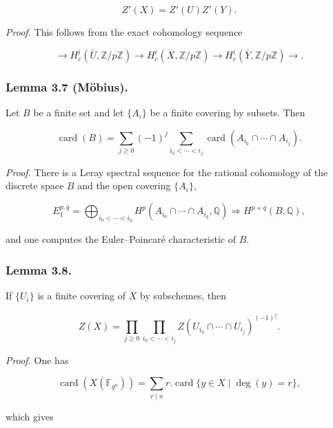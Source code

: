 \begin{equation}\tag{3.6.1}
Z'(X)=Z'(U)Z'(Y).
\end{equation}

\medskip
\noindent\emph{Proof.}
This follows from the exact cohomology sequence

\begin{equation}\tag{3.6.2}
\longrightarrow H_c^i(\bar U,\mathbb Z/p\mathbb Z)
\longrightarrow H_c^i(\bar X,\mathbb Z/p\mathbb Z)
\longrightarrow H_c^i(\bar Y,\mathbb Z/p\mathbb Z)\longrightarrow.
\end{equation}

\subsubsection*{Lemma 3.7 (M\"obius).}
Let $B$ be a finite set and let $\{A_i\}$ be a finite covering by subsets.
Then

\begin{equation}\tag{3.7.1}
\operatorname{card}(B)=
\sum_{j\geq0}(-1)^j
\sum_{i_0<\cdots<i_j}
\operatorname{card}(A_{i_0}\cap\cdots\cap A_{i_j}).
\end{equation}

\medskip
\noindent\emph{Proof.}
There is a Leray spectral sequence for the rational cohomology of the discrete
space $B$ and the open covering $\{A_i\}$,

\[
E_1^{p,q}=\bigoplus_{i_0<\cdots<i_q}
H^p(A_{i_0}\cap\cdots\cap A_{i_q},\mathbb Q)
\Longrightarrow H^{p+q}(B,\mathbb Q),
\]

and one computes the Euler--Poincar\'e characteristic of $B$.

\subsubsection*{Lemma 3.8.}
If $\{U_i\}$ is a finite covering of $X$ by subschemes, then

\begin{equation}\tag{3.8.1}
Z(X)=
\prod_{j\geq0}
\prod_{i_0<\cdots<i_j}
Z(U_{i_0}\cap\cdots\cap U_{i_j})^{(-1)^j}.
\end{equation}

\medskip
\noindent\emph{Proof.}
One has

\begin{equation}\tag{3.8.2}
\operatorname{card}(X(\mathbb F_{q^n}))
=\sum_{r\mid n}r.\operatorname{card}\{y\in X\mid\deg(y)=r\},
\end{equation}

which gives

